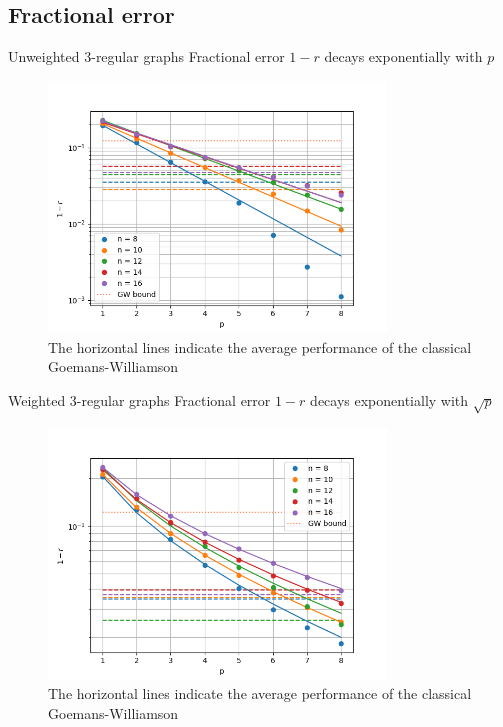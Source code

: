 \documentclass{beamer}
\begin{document}
{\subsection{Fractional error}
\begin{frame}{Unweighted 3-regular graphs}
Fractional error $1-r$ decays exponentially with $p$
\captionsetup[figure]{labelformat=empty}
\captionsetup{aboveskip=-3pt}
\begin{figure}
	\centering
	\includegraphics[width=0.8\textwidth]{figures/system-size_unweighted_exp}
	\caption{\tiny{The horizontal lines indicate the average performance of the classical Goemans-Williamson}}
\end{figure}
\end{frame}

\begin{frame}{Weighted 3-regular graphs}
Fractional error $1-r$ decays exponentially with $\sqrt{p}$
\captionsetup[figure]{labelformat=empty}
\captionsetup{aboveskip=-3pt}
\begin{figure}
	\centering
	\includegraphics[width=0.8\textwidth]{figures/system-size_sqr}
	\caption{\tiny{The horizontal lines indicate the average performance of the classical Goemans-Williamson}}
\end{figure}


\end{frame}}
\end{document}
